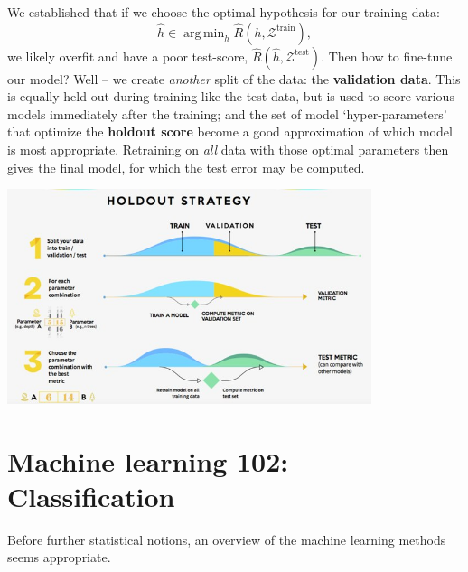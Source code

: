 \documentclass{article}
\DeclareMathOperator*{\argmin}{arg\,min}
\begin{document}
\begin{spexample}
    We established that if we choose the optimal hypothesis for our training data:
    \begin{equation}
        \hat{h} \in \argmin_{h}\hat{R}(h,\mathcal{Z}^\text{train}),
    \end{equation}
    we likely overfit and have a poor test-score, $\hat{R}(\hat{h},\mathcal{Z}^\text{test})$. Then how to fine-tune our model? Well -- we create \textit{another} split of the data: the \textbf{validation data}. This is equally held out during training like the test data, but is used to score various models immediately after the training; and the set of model `hyper-parameters' that optimize the \textbf{holdout score} become a good approximation of which model is most appropriate. Retraining on \textit{all} data with those optimal parameters then gives the final model, for which the test error may be computed.
    \begin{center}\includegraphics[width=0.8\textwidth]{holdout-strategy.jpg}\end{center}
\end{spexample}

\newpage
\section{Machine learning 102: Classification}
Before further statistical notions, an overview of the machine learning methods seems appropriate.
\end{document}
